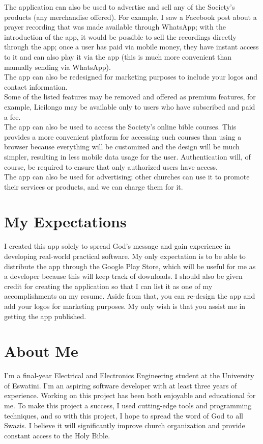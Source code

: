 \documentclass[11pt]{report}
\begin{document}
    The application can also be used to advertise and sell any of the Society's products (any merchandise offered)\@.
    For example, I saw a Facebook post about a prayer recording that was made available through WhatsApp;
    with the introduction of the app, it would be possible to sell the recordings directly through the app;
    once a user has paid via mobile money, they have instant access to it and can also play it via the app
    (this is much more convenient than manually sending via WhatsApp)\@.\\

    The app can also be redesigned for marketing purposes to include your logos and contact information.\\

    Some of the listed features may be removed and offered as premium features, for example, Licilongo may be available
    only to users who have subscribed and paid a fee.\\

    The app can also be used to access the Society's online bible courses.
    This provides a more convenient platform for accessing such courses than using a browser because everything will
    be customized and the design will be much simpler, resulting in less mobile data usage for the user.
    Authentication will, of course, be required to ensure that only authorized users have access.\\

    The app can also be used for advertising;
    other churches can use it to promote their services or products, and we can charge them for it.

    \section*{My Expectations}
    I created this app solely to spread God's message and gain experience in developing real-world practical software.
    My only expectation is to be able to distribute the app through the Google Play Store, which will be useful for me
    as a developer because this will keep track of downloads.
    I should also be given credit for creating the application so that I can list it as one of my accomplishments on my
    resume.
    Aside from that, you can re-design the app and add your logos for marketing purposes.
    My only wish is that you assist me in getting the app published.

    \section*{About Me}
    I'm a final-year Electrical and Electronics Engineering student at the University of Eswatini.
    I'm an aspiring software developer with at least three years of experience.
    Working on this project has been both enjoyable and educational for me.
    To make this project a success, I used cutting-edge tools and programming techniques, and so with this project, I
    hope to spread the word of God to all Swazis.
    I believe it will significantly improve church organization and provide constant access to the Holy Bible.
\end{document}

